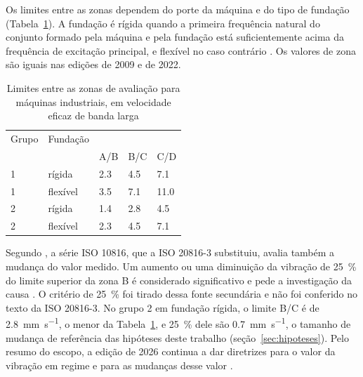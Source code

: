 Os limites entre as zonas dependem do porte da máquina e do tipo de fundação (Tabela~\ref{tab:fund-zonas}). A fundação é rígida quando a primeira frequência natural do conjunto formado pela máquina e pela fundação está suficientemente acima da frequência de excitação principal, e flexível no caso contrário \cite{iso208163_2022}. Os valores de zona são iguais nas edições de 2009 e de 2022.

\begin{table}[!htb]
\centering\small
\caption{Limites entre as zonas de avaliação para máquinas industriais, em velocidade eficaz de banda larga}\label{tab:fund-zonas}
\begin{tabular}{@{}ll*{3}{>{\centering\arraybackslash}p{15mm}}@{}}
\toprule
Grupo & Fundação & \multicolumn{3}{c}{Limite entre zonas (\si{\milli\meter\per\second})} \\
\cmidrule(l){3-5}
 & & A/B & B/C & C/D \\
\midrule
1 & rígida & \num{2,3} & \num{4,5} & \num{7,1} \\
1 & flexível & \num{3,5} & \num{7,1} & \num{11,0} \\
2 & rígida & \num{1,4} & \num{2,8} & \num{4,5} \\
2 & flexível & \num{2,3} & \num{4,5} & \num{7,1} \\
\bottomrule
\end{tabular}
\end{table}

Segundo , a série ISO 10816, que a ISO 20816-3 substituiu, avalia também a mudança do valor medido. Um aumento ou uma diminuição da vibração de \SI{25}{\percent} do limite superior da zona B é considerado significativo e pede a investigação da causa \cite{schwirzer2002}. O critério de \SI{25}{\percent} foi tirado dessa fonte secundária e não foi conferido no texto da ISO 20816-3. No grupo 2 em fundação rígida, o limite B/C é de \SI{2,8}{\milli\meter\per\second}, o menor da Tabela~\ref{tab:fund-zonas}, e \SI{25}{\percent} dele são \SI{0,7}{\milli\meter\per\second}, o tamanho de mudança de referência das hipóteses deste trabalho (seção~\ref{sec:hipoteses}). Pelo resumo do escopo, a edição de 2026 continua a dar diretrizes para o valor da vibração em regime e para as mudanças desse valor \cite{iso208163_2026}.

